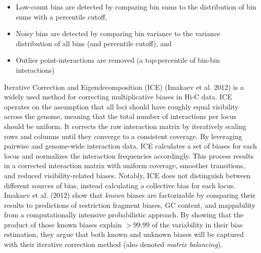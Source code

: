 \documentclass[
  11pt,
  a4paper,
]{scrbook}
\providecommand{\tightlist}{%
  \setlength{\itemsep}{0pt}\setlength{\parskip}{0pt}}\usepackage{longtable,booktabs,array}
\begin{document}
\begin{itemize}
\tightlist
\item
  Low-count bins are detected by comparing bin sums to the distribution
  of bin sums with a percentile cutoff,
\item
  Noisy bins are detected by comparing bin variance to the variance
  distribution of all bins (and percentile cutoff), and
\item
  Outlier point-interactions are removed (a top-percentile of bin-bin
  interactions)
\end{itemize}

Iterative Correction and Eigendecomposition (ICE) (Imakaev et al. 2012)
is a widely used method for correcting multiplicative biases in Hi-C
data. ICE operates on the assumption that all loci should have roughly
equal visibility across the genome, meaning that the total number of
interactions per locus should be uniform. It corrects the raw
interaction matrix by iteratively scaling rows and columns until they
converge to a consistent coverage. By leveraging pairwise and
genome-wide interaction data, ICE calculates a set of biases for each
locus and normalizes the interaction frequencies accordingly. This
process results in a corrected interaction matrix with uniform coverage,
smoother transitions, and reduced visibility-related biases. Notably,
ICE does not distinguish between different sources of bias, instead
calculating a collective bias for each locus. Imakaev et al. (2012) show
that \emph{known} biases are factorizable by comparing their results to
predictions of restriction fragment biases, GC content, and mappability
from a computationally intensive probabilistic approach. By showing that
the product of those known biases explain \(>99.99%
\) of the variability in their bias estimation, they argue that both
known and unknown biases will be captured with their iterative
correction method (also denoted \emph{matrix balancing}).
\end{document}

